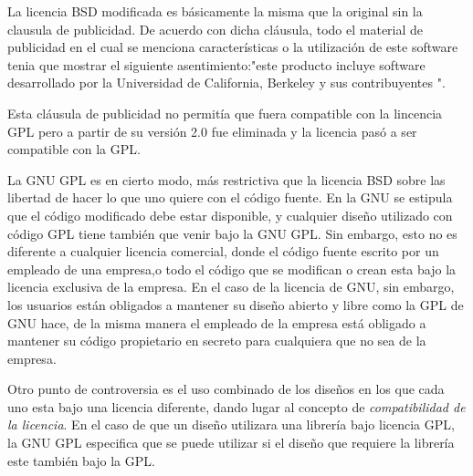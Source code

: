 La licencia BSD modificada es básicamente la misma que la original sin la clausula de publicidad. De acuerdo con dicha cláusula, todo el material de publicidad en el cual se menciona características o la utilización de este software tenia que mostrar el siguiente asentimiento:"este producto incluye software desarrollado por la Universidad de California, Berkeley y sus contribuyentes ".

Esta cláusula de publicidad no permitía que fuera compatible con la lincencia GPL pero a partir de su versión 2.0 fue eliminada y la licencia pasó a ser compatible con la GPL.

La GNU GPL es en cierto modo, más restrictiva que la licencia BSD sobre las libertad de hacer lo que uno quiere con el código fuente. En la GNU se estipula que el código modificado debe estar disponible, y cualquier diseño utilizado con código GPL tiene también que venir bajo la GNU GPL. Sin embargo, esto no es diferente a cualquier licencia comercial, donde el código fuente escrito por un empleado de una empresa,o todo el código que se modifican o crean esta bajo la licencia exclusiva de la empresa. En el caso de la licencia de GNU, sin embargo, los usuarios están obligados a mantener su diseño abierto y libre como la GPL de GNU hace, de la misma manera el empleado de la empresa está obligado a mantener su código propietario en secreto para cualquiera que no sea de la  empresa.

Otro punto de controversia es el uso combinado de los diseños en los que cada uno esta bajo una licencia diferente, dando lugar al concepto de \textit{compatibilidad de la licencia}. En el caso de que un diseño utilizara una librería bajo licencia GPL, la GNU GPL especifica que se puede utilizar si el diseño  que requiere la librería este también bajo la GPL. 

